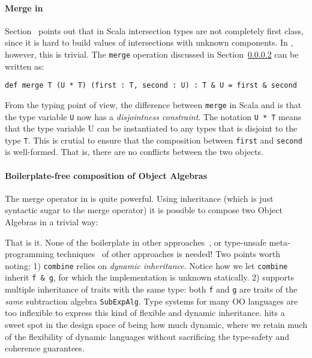 \paragraph{Merge in \name} Section~\cite{} points out that in Scala 
intersection types are not completely first class, since it is hard to 
build values of intersections with unknown components. In \name,
however, this is trivial. The \lstinline{merge} operation discussed 
in Section~\ref{} can be written as:
   
\begin{lstlisting}
def merge T (U * T) (first : T, second : U) : T & U = first & second 
\end{lstlisting}

\noindent From the typing point of view, the difference between
\lstinline{merge} in Scala and \name is that the type variable
\lstinline{U} now has a \emph{disjointness constraint}. The notation
\lstinline{U * T} means that the type variable U can be instantiated
to any types that is disjoint to the type \lstinline{T}. This is
crutial to ensure that the composition between \lstinline{first} and \lstinline{second} 
is well-formed. That is, there are no conflicts between the two objects. 

\paragraph{Boilerplate-free composition of Object Algebras} 
The merge operator in \name is quite powerful. Using \name inheritance
(which is just syntactic sugar to the merge operator) it is
possible to compose two Object Algebras in a trivial way:  



That is it. None of the boilerplate in other approaches~\cite{}, or
type-unsafe meta-programming techniques~\cite{} of other approaches is needed! 
Two points worth noting: 1) \lstinline{combine} relies
on \textit{dynamic inheritance}. Notice how we let \lstinline{combine}
inherit \lstinline{f & g}, for which the implementation is unknown
statically. 2) \name supports multiple inheritance of traits with the same type:
both \lstinline{f} and \lstinline{g} are traits of the \emph{same}
subtraction algebra \lstinline{SubExpAlg}. Type
systems for many OO languages are too inflexible to express this kind
of flexible and dynamic inheritance. \name hits a sweet spot in the design space of being how much
dynamic, where we retain much of the flexibility of dynamic languages without
sacrificing the type-safety and coherence guarantees.

